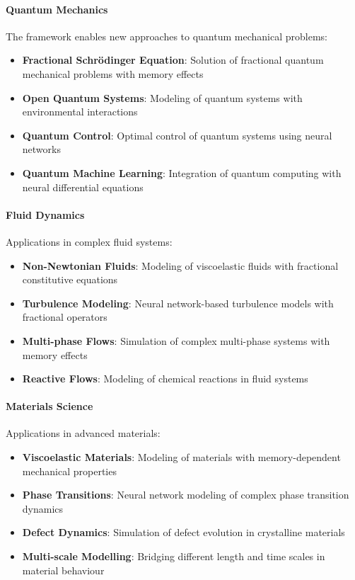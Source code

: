 \paragraph{Quantum Mechanics}
The framework enables new approaches to quantum mechanical problems:

\begin{itemize}
    \item \textbf{Fractional Schrödinger Equation}: Solution of fractional quantum mechanical problems with memory effects
    \item \textbf{Open Quantum Systems}: Modeling of quantum systems with environmental interactions
    \item \textbf{Quantum Control}: Optimal control of quantum systems using neural networks
    \item \textbf{Quantum Machine Learning}: Integration of quantum computing with neural differential equations
\end{itemize}

\paragraph{Fluid Dynamics}
Applications in complex fluid systems:

\begin{itemize}
    \item \textbf{Non-Newtonian Fluids}: Modeling of viscoelastic fluids with fractional constitutive equations
    \item \textbf{Turbulence Modeling}: Neural network-based turbulence models with fractional operators
    \item \textbf{Multi-phase Flows}: Simulation of complex multi-phase systems with memory effects
    \item \textbf{Reactive Flows}: Modeling of chemical reactions in fluid systems
\end{itemize}

\paragraph{Materials Science}
Applications in advanced materials:

\begin{itemize}
    \item \textbf{Viscoelastic Materials}: Modeling of materials with memory-dependent mechanical properties
    \item \textbf{Phase Transitions}: Neural network modeling of complex phase transition dynamics
    \item \textbf{Defect Dynamics}: Simulation of defect evolution in crystalline materials
    \item \textbf{Multi-scale Modelling}: Bridging different length and time scales in material behaviour
\end{itemize}

